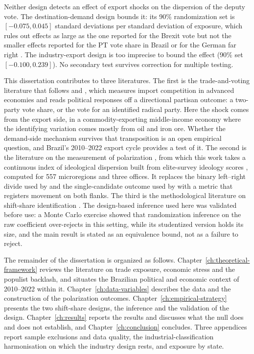 \documentclass[
	11pt,				%
	oneside,			%
	a4paper,			%
	english,			%
	english				%
	]{abntex2ppgsi}
\theoremstyle{plain}
\theoremstyle{remark}
\theoremstyle{plain}%
\theoremstyle{remark}%
\begin{document}
Neither design detects an effect of export shocks on the dispersion of the deputy vote. The destination-demand design bounds it: its 90\% randomization set is $[-0.075, 0.045]$ standard deviations per standard deviation of exposure, which rules out effects as large as the one reported for the Brexit vote \cite{colantone} but not the smaller effects reported for the PT vote share in Brazil \cite{Rettl} or for the German far right \cite{dippel}. The industry-export design is too imprecise to bound the effect (90\% set $[-0.100, 0.239]$). No secondary test survives correction for multiple testing.

This dissertation contributes to three literatures. The first is the trade-and-voting literature that follows  and , which measures import competition in advanced economies and reads political responses off a directional partisan outcome: a two-party vote share, or the vote for an identified radical party. Here the shock comes from the export side, in a commodity-exporting middle-income economy where the identifying variation comes mostly from oil and iron ore. Whether the demand-side mechanism survives that transposition is an open empirical question, and Brazil's 2010--2022 export cycle provides a test of it. The second is the literature on the measurement of polarization \cite{esteban,duclos,dalton}, from which this work takes a continuous index of ideological dispersion built from elite-survey ideology scores \cite{ZUCCO}, computed for 557 microregions and three offices. It replaces the binary left--right divide used by  and the single-candidate outcome used by  with a metric that registers movement on both flanks. The third is the methodological literature on shift-share identification \cite{quasi-experimental,goldsmith,adao}. The design-based inference used here was validated before use: a Monte Carlo exercise showed that randomization inference on the raw coefficient over-rejects in this setting, while its studentized version holds its size, and the main result is stated as an equivalence bound, not as a failure to reject.

The remainder of the dissertation is organized as follows. Chapter~\ref{ch:theoretical-framework} reviews the literature on trade exposure, economic stress and the populist backlash, and situates the Brazilian political and economic context of 2010--2022 within it. Chapter~\ref{ch:data-variables} describes the data and the construction of the polarization outcomes. Chapter~\ref{ch:empirical-strategy} presents the two shift-share designs, the inference and the validation of the design. Chapter~\ref{ch:results} reports the results and discusses what the null does and does not establish, and Chapter~\ref{ch:conclusion} concludes. Three appendices report sample exclusions and data quality, the industrial-classification harmonisation on which the industry design rests, and exposure by state.
\end{document}
